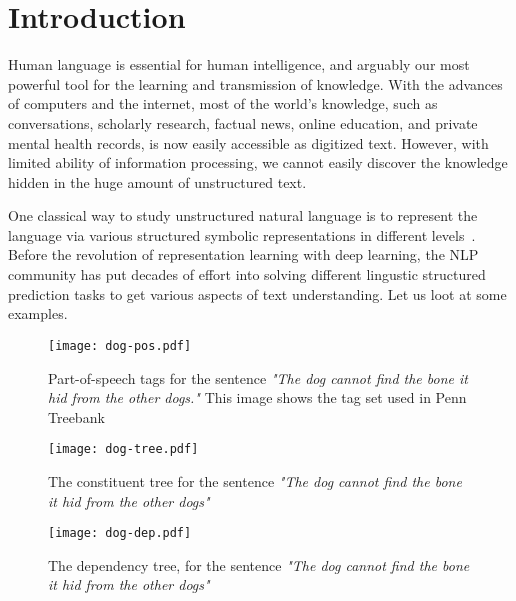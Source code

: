 
\chapter{Introduction}
\label{chap:intro}

Human language is essential for human intelligence, and arguably our
most powerful tool for the learning and transmission of
knowledge. With the advances of computers and the internet, most of
the world's knowledge, such as conversations, scholarly research,
factual news, online education, and private mental health records, is
now easily accessible as digitized text. However, with limited ability
of information processing, we cannot easily discover the knowledge
hidden in the huge amount of unstructured text.

One classical way to study unstructured natural language is to
represent the language via various structured symbolic representations
in different levels~\citep{smith2011linguistic}. Before the revolution
of representation learning with deep learning, the NLP community has
put decades of effort into solving different lingustic structured
prediction tasks to get various aspects of text understanding. Let us
loot at some examples.

\begin{figure}[!th]
\centering
\texttt{[image: dog-pos.pdf]}
\caption{\label{fig:intro-dog-pos}Part-of-speech tags for the sentence
  \textit{"The dog cannot find the bone it hid from the other dogs."}
  This image shows the tag set used in Penn
  Treebank~\cite{marcus-etal-1994-penn} }
\end{figure}

\begin{figure}[!th]
\centering
\texttt{[image: dog-tree.pdf]}
\caption{\label{fig:intro-dog-tree}The constituent tree for the sentence \textit{"The dog cannot find the bone it
    hid from the other dogs"}}
\end{figure}

\begin{figure}[!th]
\centering
\texttt{[image: dog-dep.pdf]}
\caption{\label{fig:intro-dog-dep}The dependency tree, for the
  sentence \textit{"The dog cannot find the bone it hid from the other
    dogs"}}
\end{figure}

